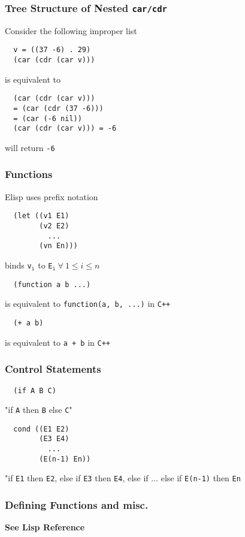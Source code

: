 \documentclass[13pt]{article}
\begin{document}
\subsubsection{Tree Structure of Nested \texttt{car/cdr}}
Consider the following improper list
\begin{verbatim}
  v = ((37 -6) . 29)
  (car (cdr (car v))) \end{verbatim}
is equivalent to 
\begin{verbatim}
  (car (cdr (car v)))
  = (car (cdr (37 -6)))
  = (car (-6 nil))
  (car (cdr (car v))) = -6 \end{verbatim}
will return \texttt{-6}

\subsubsection{Functions}
Elisp uses prefix notation
\begin{verbatim}
  (let ((v1 E1)
        (v2 E2)
          ...
        (vn En))) \end{verbatim}
      binds \texttt{v}$_\texttt{i}$ to \texttt{E}$_\texttt{i} \ \forall \ 1 \leq i \leq n$
\begin{verbatim}
  (function a b ...) \end{verbatim}
is equivalent to \texttt{function(a, b, ...)} in \texttt{C++}
\begin{verbatim}
  (+ a b) \end{verbatim}
is equivalent to \texttt{a + b} in \texttt{C++}

\subsubsection{Control Statements}
\begin{verbatim}
  (if A B C) \end{verbatim}
"if \texttt{A} then \texttt{B} else \texttt{C}"
\begin{verbatim}
  cond ((E1 E2)
        (E3 E4)
          ...
        (E(n-1) En)) \end{verbatim}
      "if \texttt{E1} then \texttt{E2}, else if \texttt{E3} then \texttt{E4}, else if $\ldots$ else if \texttt{E(n-1)} then \texttt{En}
      
      \subsubsection{Defining Functions and misc.}
      \textbf{See Lisp Reference}

\end{document}
